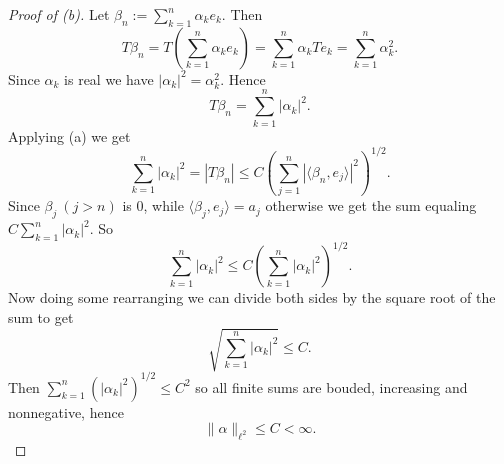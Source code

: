 \begin{proof}[Proof of (b)]
    Let $\beta_n := \sum_{k=1}^n \alpha_ke_k$. Then 
    \[
        T\beta_n = T \left(\sum_{k=1}^n\alpha_ke_k\right) 
        = \sum_{k=1}^n\alpha_k T e_k = \sum_{k=1}^n \alpha_k^2.
    \]
    Since $\alpha_k$ is real we have $|\alpha_k|^2 = \alpha_k^2$.
    Hence 
    \[
        T\beta_n = \sum_{k=1}^n |\alpha_k|^2.
    \]
    Applying (a) we get 
    \[
        \sum_{k=1}^n |\alpha_k|^2 = 
        |T\beta_n| \le C \left( 
        \sum_{j=1}^n|\langle \beta_n, e_j \rangle|^2\right)^{1/2}.
    \]
    Since $\beta_{j} \ (j > n)$ is $0$, while 
    $\langle \beta_j, e_j \rangle = a_j$ otherwise we get the 
    sum equaling $C \sum_{k=1}^n |\alpha_k|^2$. So 
    \[
        \sum_{k=1}^n |\alpha_k|^2 \leq 
        C \left(\sum_{k=1}^n |\alpha_k|^2\right)^{1/2}.
    \]
    Now doing some rearranging we can divide both sides by 
    the square root of the sum to get 
    \[
        \sqrt{\sum_{k=1}^n |\alpha_k|^2} \leq C.
    \]
    Then $\sum_{k=1}^n(|\alpha_k|^2)^{1/2} \leq C^2$ so all finite 
    sums are bouded, increasing and nonnegative, hence 
    \[
        \|\alpha\|_{\ell^2} \leq C < \infty.
    \]
\end{proof}

